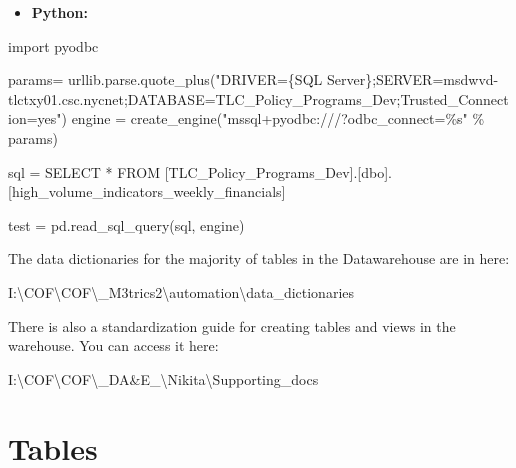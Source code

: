 \documentclass[
]{book}
\newenvironment{Shaded}{\begin{snugshade}}{\end{snugshade}}
\newcommand{\FunctionTok}[1]{\textcolor[rgb]{0.00,0.00,0.00}{#1}}
\newcommand{\NormalTok}[1]{#1}
\newcommand{\OtherTok}[1]{\textcolor[rgb]{0.56,0.35,0.01}{#1}}
\newcommand{\SpecialCharTok}[1]{\textcolor[rgb]{0.00,0.00,0.00}{#1}}
\newcommand{\StringTok}[1]{\textcolor[rgb]{0.31,0.60,0.02}{#1}}
\providecommand{\tightlist}{%
  \setlength{\itemsep}{0pt}\setlength{\parskip}{0pt}}
\begin{document}
\begin{itemize}
\tightlist
\item
  \textbf{Python:}
\end{itemize}

\begin{Shaded}
\begin{Highlighting}[]
\NormalTok{import pyodbc}

\NormalTok{params}\OtherTok{=} \FunctionTok{urllib.parse.quote\_plus}\NormalTok{(}\StringTok{"DRIVER=\{SQL Server\};SERVER=msdwvd{-}tlctxy01.csc.nycnet;DATABASE=TLC\_Policy\_Programs\_Dev;Trusted\_Connection=yes"}\NormalTok{)}
\NormalTok{engine }\OtherTok{=} \FunctionTok{create\_engine}\NormalTok{(}\StringTok{"mssql+pyodbc:///?odbc\_connect=\%s"}\NormalTok{ \% params)}


\NormalTok{sql }\OtherTok{=} \StringTok{\textquotesingle{}\textquotesingle{}\textquotesingle{}}
\StringTok{SELECT * }
\StringTok{FROM [TLC\_Policy\_Programs\_Dev].[dbo].[high\_volume\_indicators\_weekly\_financials]}
\StringTok{    \textquotesingle{}\textquotesingle{}\textquotesingle{}}
    
\NormalTok{test }\OtherTok{=} \FunctionTok{pd.read\_sql\_query}\NormalTok{(sql, engine)}
\end{Highlighting}
\end{Shaded}

The data dictionaries for the majority of tables in the Datawarehouse are in here:

\begin{Shaded}
\begin{Highlighting}[]
\NormalTok{I}\SpecialCharTok{:}\NormalTok{\textbackslash{}COF\textbackslash{}COF\textbackslash{}\_M3trics2\textbackslash{}automation\textbackslash{}data\_dictionaries}
\end{Highlighting}
\end{Shaded}

There is also a standardization guide for creating tables and views in the warehouse. You can access it here:

\begin{Shaded}
\begin{Highlighting}[]
\NormalTok{I}\SpecialCharTok{:}\NormalTok{\textbackslash{}COF\textbackslash{}COF\textbackslash{}\_DA}\SpecialCharTok{\&}\NormalTok{E\_\textbackslash{}Nikita\textbackslash{}Supporting\_docs}
\end{Highlighting}
\end{Shaded}

\hypertarget{tables}{%
\section{Tables}\label{tables}}
\end{document}
